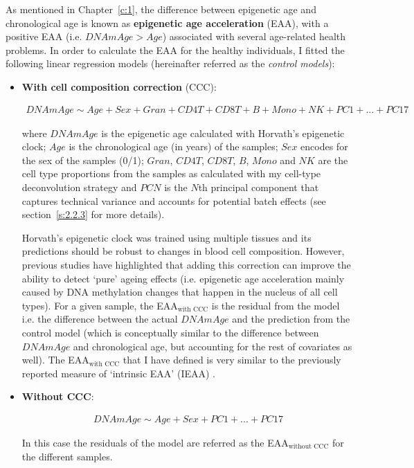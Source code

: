 \bigskip

As mentioned in Chapter~\ref{c:1}, the difference between epigenetic age and chronological age is known as \textbf{epigenetic age acceleration} (\acrshort{EAA}), with a positive EAA (i.e. $DNAmAge > Age$) associated with several age-related health problems. In order to calculate the EAA for the healthy individuals, I fitted the following linear regression models (hereinafter referred as the \textit{control models}):

\begin{itemize}
	
	\item \textbf{With cell composition correction} (CCC):
	
	\begin{align} \label{eq:2.16}
	 DNAmAge \sim Age + Sex+ Gran + CD4T + CD8T + B + Mono + NK + PC1 + ... + PC17
	\end{align}
	
	where $DNAmAge$ is the epigenetic age calculated with Horvath's epigenetic clock; $Age$ is the chronological age (in years) of the samples; $Sex$ encodes for the sex of the samples (0/1); $Gran$, $CD4T$, $CD8T$, $B$, $Mono$ and $NK$ are the cell type proportions from the samples as calculated with my cell-type deconvolution strategy and $PCN$ is the $N$th principal component that captures technical variance and accounts for potential batch effects (see section~\ref{s:2.2.3} for more details). 
	
	Horvath's epigenetic clock was trained using multiple tissues and its predictions should be robust to changes in blood cell composition. However, previous studies have highlighted that adding this correction can improve the ability to detect `pure' ageing effects \citep{Chen2016,Horvath2016} (i.e. epigenetic age acceleration mainly caused by DNA methylation changes that happen in the nucleus of all cell types). For a given sample, the EAA$_{\text{with CCC}}$ is the residual from the model i.e. the difference between the actual $DNAmAge$ and the prediction from the control model (which is conceptually similar to the difference between $DNAmAge$ and chronological age, but accounting for the rest of covariates as well). The EAA$_{\text{with CCC}}$ that I have defined is very similar to the previously reported measure of `intrinsic EAA' (\acrshort{IEAA}) \citep{Chen2016,Horvath2016}.
	
	\item \textbf{Without CCC}:
	
	\begin{align} \label{eq:2.17}
	DNAmAge \sim Age + Sex+ PC1 + ... + PC17
	\end{align}
	
	In this case the residuals of the model are referred as the EAA$_{\text{without CCC}}$ for the different samples.
	
\end{itemize}

